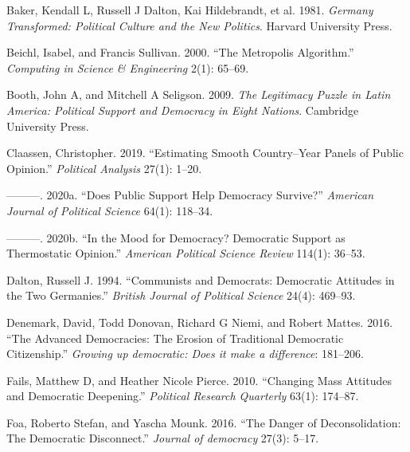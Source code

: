 \documentclass[12pt,english,a4paper,oneside]{article}
\newlength{\cslhangindent}
\newlength{\cslentryspacingunit} %
\newenvironment{CSLReferences}[2] %
 {%
  \setlength{\parindent}{0pt}
  \ifodd #1
  \let\oldpar\par
  \def\par{\hangindent=\cslhangindent\oldpar}
  \fi
  \setlength{\parskip}{#2\cslentryspacingunit}
 }%
 {}
\theoremstyle{definition}
\theoremstyle{definition}
\theoremstyle{definition}
\theoremstyle{definition}
\theoremstyle{remark}
\begin{document}
\hypertarget{refs}{}
\begin{CSLReferences}{1}{0}
\leavevmode{}%
Baker, Kendall L, Russell J Dalton, Kai Hildebrandt, et al. 1981. \emph{Germany Transformed: Political Culture and the New Politics}. Harvard University Press.

\leavevmode{}%
Beichl, Isabel, and Francis Sullivan. 2000. {``The Metropolis Algorithm.''} \emph{Computing in Science \& Engineering} 2(1): 65--69.

\leavevmode{}%
Booth, John A, and Mitchell A Seligson. 2009. \emph{The Legitimacy Puzzle in Latin America: Political Support and Democracy in Eight Nations}. Cambridge University Press.

\leavevmode{}%
Claassen, Christopher. 2019. {``Estimating Smooth Country--Year Panels of Public Opinion.''} \emph{Political Analysis} 27(1): 1--20.

\leavevmode{}%
---------. 2020a. {``Does Public Support Help Democracy Survive?''} \emph{American Journal of Political Science} 64(1): 118--34.

\leavevmode{}%
---------. 2020b. {``In the Mood for Democracy? Democratic Support as Thermostatic Opinion.''} \emph{American Political Science Review} 114(1): 36--53.

\leavevmode{}%
Dalton, Russell J. 1994. {``Communists and Democrats: Democratic Attitudes in the Two Germanies.''} \emph{British Journal of Political Science} 24(4): 469--93.

\leavevmode{}%
Denemark, David, Todd Donovan, Richard G Niemi, and Robert Mattes. 2016. {``The Advanced Democracies: The Erosion of Traditional Democratic Citizenship.''} \emph{Growing up democratic: Does it make a difference}: 181--206.

\leavevmode{}%
Fails, Matthew D, and Heather Nicole Pierce. 2010. {``Changing Mass Attitudes and Democratic Deepening.''} \emph{Political Research Quarterly} 63(1): 174--87.

\leavevmode{}%
Foa, Roberto Stefan, and Yascha Mounk. 2016. {``The Danger of Deconsolidation: The Democratic Disconnect.''} \emph{Journal of democracy} 27(3): 5--17.


\end{CSLReferences}
\end{document}
